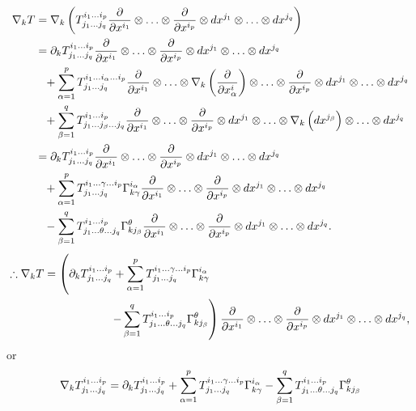 \begin{align*}
    \nabla_k T&=\nabla_k \left(
        \tensor*{T}{^{i_1\ldots i_p}_{j_1\ldots j_q}}
        \pdv{x^{i_1}}\otimes \ldots \otimes\pdv{x^{i_p}}\otimes 
        dx^{j_1}\otimes\ldots \otimes dx^{j_q}
        \right)\\
        &=\partial_k \tensor*{T}{^{i_1\ldots i_p}_{j_1\ldots j_q}}
        \pdv{x^{i_1}}\otimes \ldots \otimes\pdv{x^{i_p}}\otimes 
        dx^{j_1}\otimes\ldots \otimes dx^{j_q}\\
        &\phantom{=}+\sum_{\alpha=1}^p
        \tensor*{T}{^{i_1\ldots i_\alpha\ldots i_p}_{j_1\ldots j_q}}
        \pdv{x^{i_1}}\otimes \ldots \otimes
        \nabla_k\left(\pdv{x^i_{\alpha}}\right)\otimes
        \ldots \otimes\pdv{x^{i_p}}\otimes 
        dx^{j_1}\otimes\ldots \otimes dx^{j_q}\\
        &\phantom{=}+\sum_{\beta=1}^q
        \tensor*{T}{^{i_1\ldots i_p}_{j_1\ldots j_\beta \ldots j_q}}
        \pdv{x^{i_1}}\otimes \ldots \otimes\pdv{x^{i_p}}\otimes 
        dx^{j_1}\otimes\ldots\otimes \nabla_k\left(
        d x^{j_\beta}\right)\otimes\ldots \otimes dx^{j_q}\\
        &=\partial_k \tensor*{T}{^{i_1\ldots i_p}_{j_1\ldots j_q}}
        \pdv{x^{i_1}}\otimes \ldots \otimes\pdv{x^{i_p}}\otimes 
        dx^{j_1}\otimes\ldots \otimes dx^{j_q}\\
        &\phantom{=}+\sum_{\alpha=1}^p
        \tensor*{T}{^{i_1\ldots \gamma\ldots i_p}_{j_1\ldots j_q}}
        \Gamma\indices*{_{k\gamma}^{i_\alpha}}
        \pdv{x^{i_1}}\otimes \ldots\otimes\pdv{x^{i_p}}\otimes 
        dx^{j_1}\otimes\ldots \otimes dx^{j_q}\\
        &\phantom{=}-\sum_{\beta=1}^q 
        \tensor*{T}{^{i_1\ldots i_p}_{j_1\ldots\theta \ldots j_q}}
        \Gamma\indices*{_{kj_\beta}^\theta}
        \pdv{x^{i_1}}\otimes \ldots \otimes\pdv{x^{i_p}}\otimes 
        dx^{j_1}\otimes\ldots \otimes dx^{j_q}.
\end{align*}
\begin{align*}
    \therefore\nabla_k T&=\left(
    \partial_k \tensor*{T}{^{i_1\ldots i_p}_{j_1\ldots j_q}}
    +\sum_{\alpha=1}^p
    \tensor*{T}{^{i_1\ldots \gamma\ldots i_p}_{j_1\ldots j_q}}
    \Gamma\indices*{_{k\gamma}^{i_\alpha}}\right.\\
    &\phantom{aaaaaaaaaaa}\left.
    -\sum_{\beta=1}^q 
        \tensor*{T}{^{i_1\ldots i_p}_{j_1\ldots\theta \ldots j_q}}
        \Gamma\indices*{_{kj_\beta}^\theta}
    \right)\pdv{x^{i_1}}\otimes \ldots \otimes\pdv{x^{i_p}}\otimes 
    dx^{j_1}\otimes\ldots \otimes dx^{j_q},
\end{align*}
or
\[\nabla_k \tensor*{T}{^{i_1\ldots i_p}_{j_1\ldots j_q}}
=\partial_k \tensor*{T}{^{i_1\ldots i_p}_{j_1\ldots j_q}}
+\sum_{\alpha=1}^p
\tensor*{T}{^{i_1\ldots \gamma\ldots i_p}_{j_1\ldots j_q}}
\Gamma\indices*{_{k\gamma}^{i_\alpha}}
-\sum_{\beta=1}^q 
\tensor*{T}{^{i_1\ldots i_p}_{j_1\ldots\theta \ldots j_q}}
\Gamma\indices*{_{kj_\beta}^\theta}\]